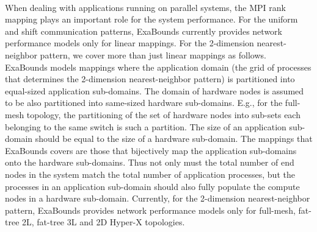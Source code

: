  \\

When dealing with applications running on parallel systems, the MPI rank mapping plays an important role for the system performance. 
For the uniform and shift communication patterns, ExaBounds currently provides network performance models only for linear mappings. 
For the 2-dimension nearest-neighbor pattern, we cover more than just linear mappings as follows. \\

ExaBounds models mappings where the application domain (the grid of processes that
determines the 2-dimension nearest-neighbor pattern) is partitioned into equal-sized application sub-domains.
The domain of hardware nodes is assumed to be also partitioned into same-sized hardware sub-domains. 
E.g., for the full-mesh topology, the partitioning of the set of hardware nodes into sub-sets each belonging to the same switch is such a partition.
The size of an application sub-domain should be equal to the size of a hardware sub-domain.
The mappings that ExaBounds covers are those that bijectively map the application sub-domains onto the hardware sub-domains. 
Thus not only must the total number of end nodes in the system match the total
number of application processes, but the processes in an application sub-domain
should also fully populate the compute nodes in a hardware sub-domain.  
Currently, for the 2-dimension nearest-neighbor pattern, ExaBounds provides network performance models only for 
full-mesh, fat-tree 2L, fat-tree 3L and 2D Hyper-X topologies. \\

 \\

